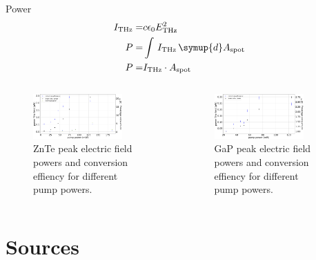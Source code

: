 \documentclass[aspectratio=1610, 9pt]{beamer}
\begin{document}
\begin{frame}{Power}
  \begin{align}
    I_\text{THz} =& c \epsilon_0 E_\text{THz}^2 \\
    P =& \int\, I_\text{THz} \,\symup{d}A_\text{spot}\\
    P =& I_\text{THz}\cdot A_\text{spot}
\end{align}
  \begin{columns}
    \begin{column}{.5\textwidth}
  \begin{figure}
    \includegraphics[width=0.8\textwidth]{images/Powerznte.pdf}
    \caption{ZnTe peak electric field powers and conversion effiency for different pump powers.}
  \end{figure}
  \end{column}
  \begin{column}{.5\textwidth}
    \begin{figure}
      \includegraphics[width=0.8\textwidth]{images/Powergap.pdf}
      \caption{GaP peak electric field powers and conversion effiency for different pump powers.}
    \end{figure}    
  \end{column}
  \end{columns}
\end{frame}

\section{Sources}
\printbibliography
\end{document}
